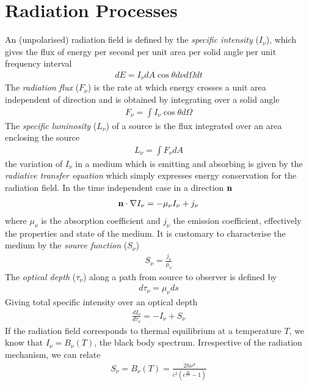 \section{Radiation Processes}
\label{app_opticallythickapprox}
An (unpolarised) radiation field is defined by the {\it specific intensity} ($I_\nu$), which gives the flux of energy per second per unit area
per solid angle per unit frequency interval
\begin{eqnarray*}
	dE=I_\nu dA \cos\theta d\nu d\Omega dt
\end{eqnarray*}
The {\it radiation flux} ($F_\nu$) is the rate at which energy crosses a unit area independent of direction and is obtained by integrating
over a solid angle
\begin{eqnarray*}
	F_\nu=\int I_\nu \cos\theta d\Omega
\end{eqnarray*}
The {\it specific luminosity} ($L_\nu$) of a source is the flux integrated over an area enclosing the source
\begin{eqnarray*}
	L_\nu = \int F_\nu dA
\end{eqnarray*}
the variation of $I_\nu$ in a medium which is emitting and absorbing is given by the {\it radiative transfer equation} which simply expresses
energy conservation for the radiation field. In the time independent case in a direction ${\bf n}$
\begin{eqnarray*}
	{\bf n}\cdot \nabla I_\nu = -\mu_\nu I_\nu + j_\nu
\end{eqnarray*}
where $\mu_\nu$ is the absorption coefficient and $j_\nu$ the emission coefficient, effectively the properties and state of the medium. It is
customary to characterise the medium by the {\it source function} ($S_\nu$)
\begin{eqnarray*}
	S_\nu = \frac{j_\nu}{\mu_\nu}
\end{eqnarray*}
The {\it optical depth} ($\tau_\nu$) along a path from source to observer is defined by
\begin{eqnarray*}
	d\tau_\nu=\mu_\nu ds
\end{eqnarray*}
Giving total specific intensity over an optical depth
\begin{eqnarray*}
	\frac{dI_\nu}{d\tau_\nu} = -I_\nu + S_\nu
\end{eqnarray*}
If the radiation field corresponds to thermal equilibrium at a temperature $T$, we know that $I_\nu=B_\nu(T)$, the black body spectrum.
Irrespective of the radiation mechanism, we can relate
\begin{eqnarray*}
	S_\nu=B_\nu(T)=\frac{2h\nu^3}{c^2\left(e^{\frac{h\nu}{kT}}-1\right)}
\end{eqnarray*}
